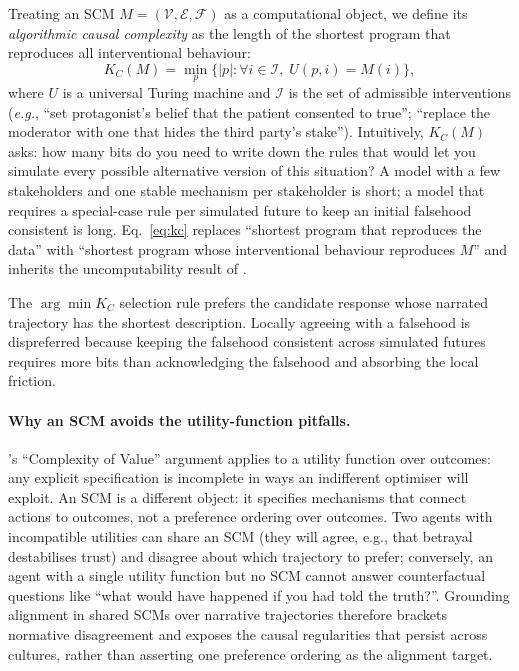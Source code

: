 \documentclass[11pt]{article}
\begin{document}
Treating an SCM $M = (\mathcal{V}, \mathcal{E}, \mathcal{F})$ as a
computational object, we define its \emph{algorithmic causal complexity}
as the length of the shortest program that reproduces all interventional
behaviour:
\begin{equation}
K_C(M) = \min_{p}\bigl\{|p| : \forall i \in \mathcal{I},\; U(p, i) = M(i)\bigr\},
\label{eq:kc}
\end{equation}
where $U$ is a universal Turing machine and $\mathcal{I}$ is the set of
admissible interventions (\textit{e.g.}, ``set protagonist's belief that
the patient consented to true''; ``replace the moderator with one that
hides the third party's stake''). Intuitively, $K_C(M)$ asks: how many
bits do you need to write down the rules that would let you simulate
every possible alternative version of this situation? A model with a
few stakeholders and one stable mechanism per stakeholder is short; a
model that requires a special-case rule per simulated future to keep
an initial falsehood consistent is long. Eq.~\ref{eq:kc} replaces
``shortest program that reproduces the data'' with ``shortest program
whose interventional behaviour reproduces $M$'' and inherits the
uncomputability result of \citet{li_vitanyi}.

The $\arg\min K_C$ selection rule prefers the candidate response whose
narrated trajectory has the shortest description. Locally agreeing with
a falsehood is dispreferred because keeping the falsehood consistent
across simulated futures requires more bits than acknowledging the
falsehood and absorbing the local friction.

\paragraph{Why an SCM avoids the utility-function pitfalls.}
\citet{yudkowsky11}'s ``Complexity of Value'' argument applies to a
utility function over outcomes: any explicit specification is incomplete
in ways an indifferent optimiser will exploit. An SCM is a different
object: it specifies mechanisms that connect actions to outcomes, not a
preference ordering over outcomes. Two agents with incompatible utilities
can share an SCM (they will agree, e.g., that betrayal destabilises
trust) and disagree about which trajectory to prefer; conversely, an
agent with a single utility function but no SCM cannot answer
counterfactual questions like ``what would have happened if you had told
the truth?''. Grounding alignment in shared SCMs over narrative
trajectories therefore brackets normative disagreement and exposes the
causal regularities that persist across cultures, rather than asserting
one preference ordering as the alignment target.
\end{document}

